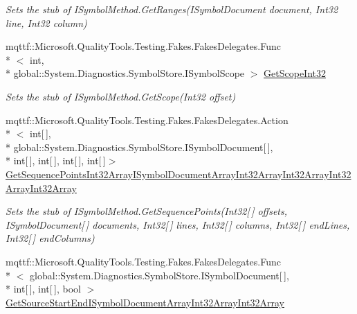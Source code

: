 \begin{DoxyCompactItemize}
\begin{DoxyCompactList}\small\item\em Sets the stub of I\-Symbol\-Method.\-Get\-Ranges(\-I\-Symbol\-Document document, Int32 line, Int32 column)\end{DoxyCompactList}\item 
mqttf\-::\-Microsoft.\-Quality\-Tools.\-Testing.\-Fakes.\-Fakes\-Delegates.\-Func\\*
$<$ int, \\*
global\-::\-System.\-Diagnostics.\-Symbol\-Store.\-I\-Symbol\-Scope $>$ \hyperlink{class_system_1_1_diagnostics_1_1_symbol_store_1_1_fakes_1_1_stub_i_symbol_method_a06d6ec419f665b4436ff10d982e67dc6}{Get\-Scope\-Int32}
\begin{DoxyCompactList}\small\item\em Sets the stub of I\-Symbol\-Method.\-Get\-Scope(\-Int32 offset)\end{DoxyCompactList}\item 
mqttf\-::\-Microsoft.\-Quality\-Tools.\-Testing.\-Fakes.\-Fakes\-Delegates.\-Action\\*
$<$ int\mbox{[}$\,$\mbox{]}, \\*
global\-::\-System.\-Diagnostics.\-Symbol\-Store.\-I\-Symbol\-Document\mbox{[}$\,$\mbox{]}, \\*
int\mbox{[}$\,$\mbox{]}, int\mbox{[}$\,$\mbox{]}, int\mbox{[}$\,$\mbox{]}, int\mbox{[}$\,$\mbox{]}$>$ \hyperlink{class_system_1_1_diagnostics_1_1_symbol_store_1_1_fakes_1_1_stub_i_symbol_method_aa42a2e4e0749079374d179e328b12877}{Get\-Sequence\-Points\-Int32\-Array\-I\-Symbol\-Document\-Array\-Int32\-Array\-Int32\-Array\-Int32\-Array\-Int32\-Array}
\begin{DoxyCompactList}\small\item\em Sets the stub of I\-Symbol\-Method.\-Get\-Sequence\-Points(\-Int32\mbox{[}$\,$\mbox{]} offsets, I\-Symbol\-Document\mbox{[}$\,$\mbox{]} documents, Int32\mbox{[}$\,$\mbox{]} lines, Int32\mbox{[}$\,$\mbox{]} columns, Int32\mbox{[}$\,$\mbox{]} end\-Lines, Int32\mbox{[}$\,$\mbox{]} end\-Columns)\end{DoxyCompactList}\item 
mqttf\-::\-Microsoft.\-Quality\-Tools.\-Testing.\-Fakes.\-Fakes\-Delegates.\-Func\\*
$<$ global\-::\-System.\-Diagnostics.\-Symbol\-Store.\-I\-Symbol\-Document\mbox{[}$\,$\mbox{]}, \\*
int\mbox{[}$\,$\mbox{]}, int\mbox{[}$\,$\mbox{]}, bool $>$ \hyperlink{class_system_1_1_diagnostics_1_1_symbol_store_1_1_fakes_1_1_stub_i_symbol_method_af8e9fa3fe274ae98f7332b945510ef47}{Get\-Source\-Start\-End\-I\-Symbol\-Document\-Array\-Int32\-Array\-Int32\-Array}

\end{DoxyCompactItemize}
